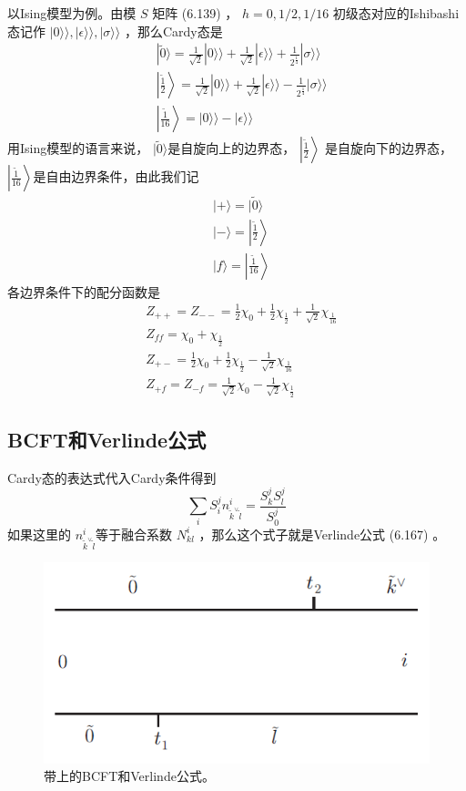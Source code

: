 以Ising模型为例。由模 $S$ 矩阵 (6.139) ， $h=0,1/2,1/16$ 初级态对应的Ishibashi态记作 $|0\rangle\rangle,|\epsilon\rangle\rangle,|\sigma\rangle\rangle$ ，那么Cardy态是
\begin{equation}
	\begin{aligned} & |\tilde{0}\rangle=\frac{1}{\sqrt{2}}|0\rangle \rangle+\frac{1}{\sqrt{2}}|\epsilon\rangle \rangle+\frac{1}{2^{\frac{1}{4}}}|\sigma\rangle \rangle \\ & \left|\frac{\tilde{1}}{2}\right\rangle=\frac{1}{\sqrt{2}}|0\rangle \rangle+\frac{1}{\sqrt{2}}|\epsilon\rangle \rangle-\frac{1}{2^{\frac{1}{4}}}|\sigma\rangle \rangle \\ & \left|\frac{\tilde{1}}{16}\right\rangle=|0\rangle \rangle-|\epsilon\rangle \rangle \end{aligned}
\end{equation}
用Ising模型的语言来说， $|\tilde{0}\rangle $是自旋向上的边界态， $\left|\frac{\tilde{1}}{2}\right\rangle$ 是自旋向下的边界态， $\left|\frac{\tilde{1}}{16}\right\rangle $是自由边界条件，由此我们记
\begin{equation}
	\begin{aligned} &|+\rangle=|\tilde{0}\rangle \\ &|-\rangle=\left|\frac{\tilde{1}}{2}\right\rangle \\ &|f\rangle=\left|\frac{\tilde{1}}{16}\right\rangle \end{aligned} 
\end{equation}
各边界条件下的配分函数是
\begin{align} &Z_{++}=Z_{--}=\frac{1}{2} \chi_{0}+\frac{1}{2} \chi_{\frac{1}{2}}+\frac{1}{\sqrt{2}} \chi_{\frac{1}{16}} \\ &Z_{f f}=\chi_{0}+\chi_{\frac{1}{2}}\\ &Z_{+-}=\frac{1}{2} \chi_{0}+\frac{1}{2} \chi_{\frac{1}{2}}-\frac{1}{\sqrt{2}} \chi_{\frac{1}{16}}\\ &Z_{+f}=Z_{-f}=\frac{1}{\sqrt{2}} \chi_{0}-\frac{1}{\sqrt{2}} \chi_{\frac{1}{2}} \end{align}

\subsection{BCFT和Verlinde公式}
Cardy态的表达式代入Cardy条件得到
\begin{equation}
	\sum_{i} S_{i}^{j} n_{\tilde{k}^{\vee} \tilde{l}}^{i}=\frac{S_{k}^{j} S_{l}^{j}}{S_{0}^{j}}
\end{equation} 
如果这里的 $n_{\tilde{k}^{\vee} \tilde{l}}^{i} $等于融合系数 $N_{k l}^{i}$ ，那么这个式子就是Verlinde公式 (6.167) 。
\begin{figure}[h]
	\centering
	\includegraphics[width=0.6\linewidth]{fig/7.6.png}
	\caption{带上的BCFT和Verlinde公式。}
\end{figure}

